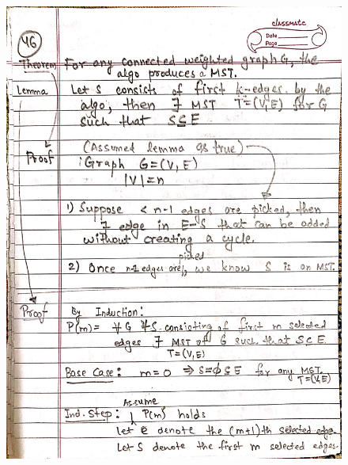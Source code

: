 \begin{figure}[H]
    \centering
    \includegraphics[scale=0.25]{"./MIT-6.042J/MIT-6042J-046"}
\end{figure}
\newpage
